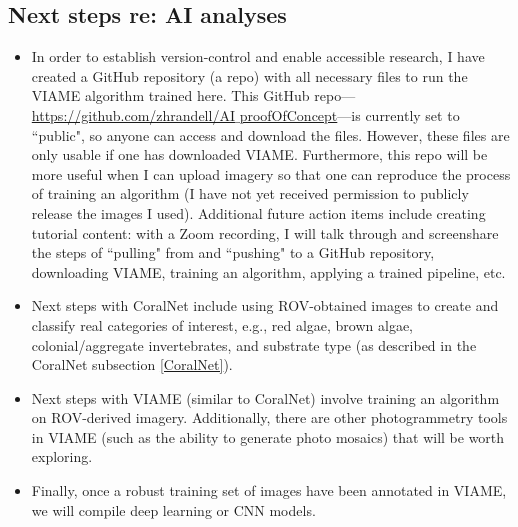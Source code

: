 \documentclass[11pt]{article}
\newcommand{\pt}{\vspace{-.5em}} %
\begin{document}
\subsection{Next steps re: AI analyses}
\begin{itemize}
\pt
\item In order to establish version-control and enable accessible 
research, I have created a GitHub repository (a repo) with all 
necessary files to run the VIAME algorithm trained here. 
This GitHub repo--- 
\href{https://github.com/zhrandell/AI\_proofOfConcept}{https://github.com/zhrandell/AI$\_$proofOfConcept}---is
 currently set to ``public", so anyone can access and 
download the files. 
However, these files are only usable if one has downloaded VIAME.
Furthermore, this repo will be more useful when I can upload imagery so 
that one can reproduce the process of training an algorithm (I have not 
yet received permission to publicly release the images I used). 
Additional future action items include creating tutorial content: with 
a Zoom recording, I will talk through and screenshare the steps of 
``pulling" from and ``pushing" to a GitHub repository, downloading 
VIAME, training an algorithm, applying a trained pipeline, etc.
\pt
\item Next steps with CoralNet include using ROV-obtained images to 
create and classify real categories of interest, e.g., red algae, brown 
algae, colonial/aggregate invertebrates, and substrate type (as 
described in the CoralNet subsection \ref{CoralNet}).
\pt
\item Next steps with VIAME (similar to CoralNet) involve training an 
algorithm on ROV-derived imagery. 
Additionally, there are other photogrammetry tools in VIAME (such as 
the ability to generate photo mosaics) that will be worth exploring.
\pt
\item Finally, once a robust training set of images have been annotated 
in VIAME, we will compile deep learning or CNN models. 
\end{itemize}





\end{document}
